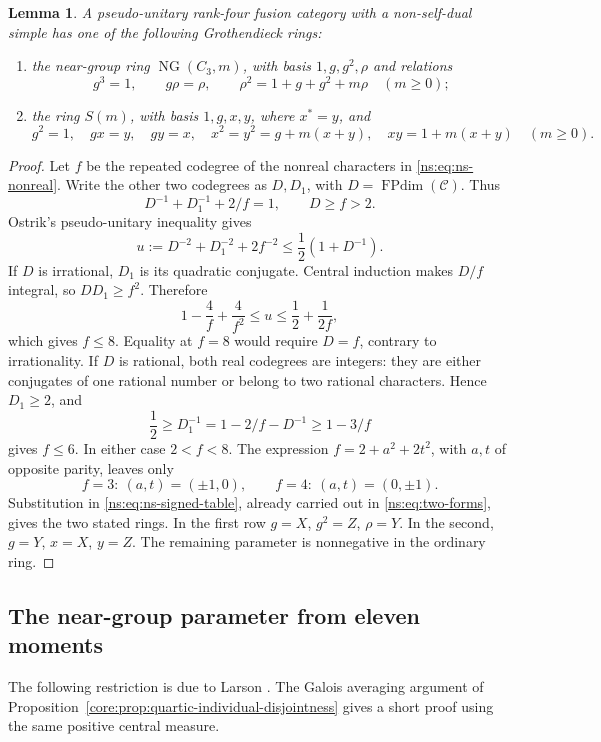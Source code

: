 \documentclass[11pt,a4paper]{article}
\newtheorem{lemma}[theorem]{Lemma}
\theoremstyle{definition}\newtheorem{definition}[theorem]{Definition}
\theoremstyle{remark}\newtheorem{remark}[theorem]{Remark}
\newcommand{\C}{\mathcal C}
\numberwithin{equation}{section}
\begin{document}
\begin{lemma}\label{nsnew:two-families}
A pseudo-unitary rank-four fusion category with a non-self-dual simple
has one of the following Grothendieck rings:
\begin{enumerate}
\item the near-group ring $\operatorname{NG}(C_3,m)$, with basis
$1,g,g^2,\rho$ and relations
\[
 g^3=1,\qquad g\rho=\rho,\qquad
 \rho^2=1+g+g^2+m\rho\quad(m\ge0);
\]
\item the ring $S(m)$, with basis $1,g,x,y$, where $x^*=y$, and
\[
 g^2=1,\quad gx=y,\quad gy=x,\quad
 x^2=y^2=g+m(x+y),\quad xy=1+m(x+y)\quad(m\ge0).
\]
\end{enumerate}
\end{lemma}
\begin{proof}
Let $f$ be the repeated codegree of the nonreal characters in
\eqref{ns:eq:ns-nonreal}. Write the other two codegrees as $D,D_1$, with
$D=\operatorname{FPdim}(\C)$. Thus
\[
 D^{-1}+D_1^{-1}+2/f=1,\qquad D\ge f>2.
\]
Ostrik's pseudo-unitary inequality \cite[Theorem~2.21]{Ostrik3} gives
\begin{equation}\label{nsnew:first-moment}
 u:=D^{-2}+D_1^{-2}+2f^{-2}\le\frac12(1+D^{-1}).
\end{equation}
If $D$ is irrational, $D_1$ is its quadratic conjugate. Central
induction makes $D/f$ integral, so $DD_1\ge f^2$. Therefore
\[
 1-\frac4f+\frac4{f^2}\le u\le\frac12+\frac1{2f},
\]
which gives $f\le8$. Equality at $f=8$ would require $D=f$,
contrary to irrationality. If $D$ is rational, both real codegrees
are integers: they are either conjugates of one rational number or
belong to two rational characters. Hence $D_1\ge2$, and
\[
 \frac12\ge D_1^{-1}=1-2/f-D^{-1}\ge1-3/f
\]
gives $f\le6$. In either case $2<f<8$. The expression
$f=2+a^2+2t^2$, with $a,t$ of opposite parity, leaves only
\[
 f=3:\ (a,t)=(\pm1,0),\qquad
 f=4:\ (a,t)=(0,\pm1).
\]
Substitution in \eqref{ns:eq:ns-signed-table}, already carried out in
\eqref{ns:eq:two-forms}, gives the two stated rings. In the first row
$g=X$, $g^2=Z$, $\rho=Y$. In the second, $g=Y$, $x=X$, $y=Z$.
The remaining parameter is nonnegative in the ordinary ring.
\end{proof}

\subsection{The near-group parameter from eleven moments}

The following restriction is due to Larson
\cite[Theorem~4.11]{Larson}. The Galois averaging argument of
Proposition~\ref{core:prop:quartic-individual-disjointness} gives a
short proof using the same positive central measure.
\end{document}
